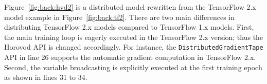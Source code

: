 Figure~\ref{fig:back:hvd2} is a distributed model rewritten from the
TensorFlow 2.x model example in Figure~\ref{fig:back:tf2}.
There are two main differences in distributing TensorFlow 2.x models compared
to TensorFlow 1.x models. 
First, the main training loop is eagerly executed in the TensorFlow 2.x
version; thus the Horovod API is changed accordingly. 
For instance, the {\tt DistributedGradientTape} API in line 26 supports the
automatic gradient computation in TensorFlow 2.x. 
Second, the variable broadcasting is explicitly executed at the first training
epoch as shown in lines 31 to 34.

